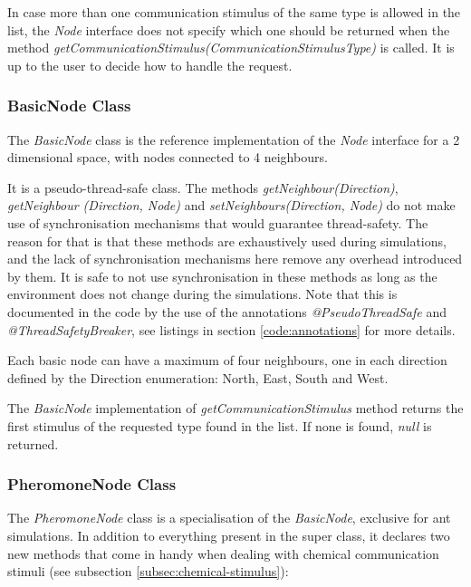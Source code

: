 In case more than one communication stimulus of the same type is allowed in the list, the \emph{Node} interface does not specify which one should be returned when the method \emph{getCommunicationStimulus(CommunicationStimulusType)} is called. It is up to the user to decide how to handle the request.

\subsubsection{BasicNode Class}

The \emph{BasicNode} class is the reference implementation of the \emph{Node} interface for a 2 dimensional space, with nodes connected to 4 neighbours.

It is a pseudo-thread-safe class. The methods \emph{getNeighbour(Direction)}, \emph{getNeighbour (Direction, Node)} and \emph{setNeighbours(Direction, Node)} do not make use of synchronisation mechanisms that would guarantee thread-safety. The reason for that is that these  methods are exhaustively used during simulations, and the lack of synchronisation mechanisms here remove any overhead introduced by them. It is safe to not use synchronisation in these methods as long as the environment does not change during the simulations. Note that this is documented in the code by the use of the annotations \emph{@PseudoThreadSafe} and \emph{@ThreadSafetyBreaker}, see listings in section \ref{code:annotations} for more details.

Each basic node can have a maximum of four neighbours, one in each direction defined by the Direction enumeration: North, East, South and West.

The \emph{BasicNode} implementation of \emph{getCommunicationStimulus} method returns the first stimulus of the requested type found in the list. If none is found, \emph{null} is returned.

\subsubsection{PheromoneNode Class}

The \emph{PheromoneNode} class is a specialisation of the \emph{BasicNode}, exclusive for ant simulations. In addition to everything present in the super class, it declares two new methods that come in handy when dealing with chemical communication stimuli (see subsection \ref{subsec:chemical-stimulus}):

